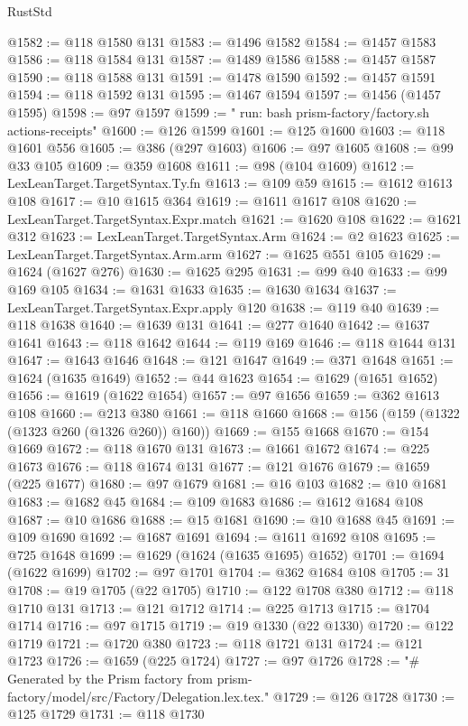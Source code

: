 \begin{lexlean}{RustStd}
\begin{coremodule}
@1582 := @118 @1580 @131
@1583 := @1496 @1582
@1584 := @1457 @1583
@1586 := @118 @1584 @131
@1587 := @1489 @1586
@1588 := @1457 @1587
@1590 := @118 @1588 @131
@1591 := @1478 @1590
@1592 := @1457 @1591
@1594 := @118 @1592 @131
@1595 := @1467 @1594
@1597 := @1456 (@1457 @1595)
@1598 := @97 @1597
@1599 := "        run: bash prism-factory/factory.sh actions-receipts"
@1600 := @126 @1599
@1601 := @125 @1600
@1603 := @118 @1601 @556
@1605 := @386 (@297 @1603)
@1606 := @97 @1605
@1608 := @99 @33 @105
@1609 := @359 @1608
@1611 := @98 (@104 @1609)
@1612 := LexLeanTarget.TargetSyntax.Ty.fn
@1613 := @109 @59
@1615 := @1612 @1613 @108
@1617 := @10 @1615 @364
@1619 := @1611 @1617 @108
@1620 := LexLeanTarget.TargetSyntax.Expr.match
@1621 := @1620 @108
@1622 := @1621 @312
@1623 := LexLeanTarget.TargetSyntax.Arm
@1624 := @2 @1623
@1625 := LexLeanTarget.TargetSyntax.Arm.arm
@1627 := @1625 @551 @105
@1629 := @1624 (@1627 @276)
@1630 := @1625 @295
@1631 := @99 @40
@1633 := @99 @169 @105
@1634 := @1631 @1633
@1635 := @1630 @1634
@1637 := LexLeanTarget.TargetSyntax.Expr.apply @120
@1638 := @119 @40
@1639 := @118 @1638
@1640 := @1639 @131
@1641 := @277 @1640
@1642 := @1637 @1641
@1643 := @118 @1642
@1644 := @119 @169
@1646 := @118 @1644 @131
@1647 := @1643 @1646
@1648 := @121 @1647
@1649 := @371 @1648
@1651 := @1624 (@1635 @1649)
@1652 := @44 @1623
@1654 := @1629 (@1651 @1652)
@1656 := @1619 (@1622 @1654)
@1657 := @97 @1656
@1659 := @362 @1613 @108
@1660 := @213 @380
@1661 := @118 @1660
@1668 := @156 (@159 (@1322 (@1323 @260 (@1326 @260)) @160))
@1669 := @155 @1668
@1670 := @154 @1669
@1672 := @118 @1670 @131
@1673 := @1661 @1672
@1674 := @225 @1673
@1676 := @118 @1674 @131
@1677 := @121 @1676
@1679 := @1659 (@225 @1677)
@1680 := @97 @1679
@1681 := @16 @103
@1682 := @10 @1681
@1683 := @1682 @45
@1684 := @109 @1683
@1686 := @1612 @1684 @108
@1687 := @10 @1686
@1688 := @15 @1681
@1690 := @10 @1688 @45
@1691 := @109 @1690
@1692 := @1687 @1691
@1694 := @1611 @1692 @108
@1695 := @725 @1648
@1699 := @1629 (@1624 (@1635 @1695) @1652)
@1701 := @1694 (@1622 @1699)
@1702 := @97 @1701
@1704 := @362 @1684 @108
@1705 := 31
@1708 := @19 @1705 (@22 @1705)
@1710 := @122 @1708 @380
@1712 := @118 @1710 @131
@1713 := @121 @1712
@1714 := @225 @1713
@1715 := @1704 @1714
@1716 := @97 @1715
@1719 := @19 @1330 (@22 @1330)
@1720 := @122 @1719
@1721 := @1720 @380
@1723 := @118 @1721 @131
@1724 := @121 @1723
@1726 := @1659 (@225 @1724)
@1727 := @97 @1726
@1728 := "# Generated by the Prism factory from prism-factory/model/src/Factory/Delegation.lex.tex."
@1729 := @126 @1728
@1730 := @125 @1729
@1731 := @118 @1730

\end{coremodule}
\end{lexlean}
